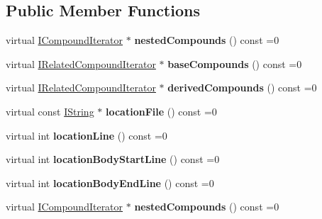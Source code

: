 \subsection*{Public Member Functions}
\begin{DoxyCompactItemize}
\item 
\mbox{\label{class_i_struct_a5e98f1fe7cd97ce6a496d99526e7be6e}} 
virtual \mbox{\hyperlink{class_i_compound_iterator}{I\+Compound\+Iterator}} $\ast$ {\bfseries nested\+Compounds} () const =0
\item 
\mbox{\label{class_i_struct_abc64f1ce0d2c39d6c6451bee57e16dd9}} 
virtual \mbox{\hyperlink{class_i_related_compound_iterator}{I\+Related\+Compound\+Iterator}} $\ast$ {\bfseries base\+Compounds} () const =0
\item 
\mbox{\label{class_i_struct_ade71cbf4e35aea5be4ea2c5528782ab3}} 
virtual \mbox{\hyperlink{class_i_related_compound_iterator}{I\+Related\+Compound\+Iterator}} $\ast$ {\bfseries derived\+Compounds} () const =0
\item 
\mbox{\label{class_i_struct_a6427208325a1a9a648e43aa254ec483b}} 
virtual const \mbox{\hyperlink{class_i_string}{I\+String}} $\ast$ {\bfseries location\+File} () const =0
\item 
\mbox{\label{class_i_struct_afd43fdec6f15bc6d2009783b065c7b6e}} 
virtual int {\bfseries location\+Line} () const =0
\item 
\mbox{\label{class_i_struct_aacecbb0d8efd04c45dc9c3c999e1d0f8}} 
virtual int {\bfseries location\+Body\+Start\+Line} () const =0
\item 
\mbox{\label{class_i_struct_a809fa0d9316b8264c5052ad85450b371}} 
virtual int {\bfseries location\+Body\+End\+Line} () const =0
\item 
\mbox{\label{class_i_struct_a5e98f1fe7cd97ce6a496d99526e7be6e}} 
virtual \mbox{\hyperlink{class_i_compound_iterator}{I\+Compound\+Iterator}} $\ast$ {\bfseries nested\+Compounds} () const =0
\item 
\mbox{\label{class_i_struct_abc64f1ce0d2c39d6c6451bee57e16dd9}} 

\end{DoxyCompactItemize}
